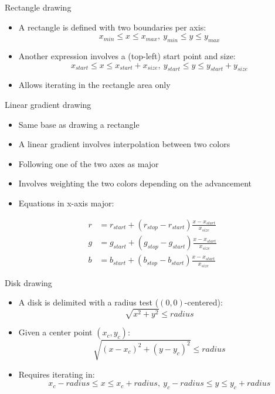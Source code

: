 \begin{frame}{Rectangle drawing}
  \begin{itemize}
  \item A rectangle is defined with two boundaries per axis:
\[
x_{min} \leq x \leq x_{max},~ y_{min} \leq y \leq y_{max}
\]
  \item Another expression involves a (top-left) start point and size:
\[
x_{start} \leq x \leq x_{start} + x_{size},~ y_{start} \leq y \leq y_{start} + y_{size}
\]
  \item Allows iterating in the rectangle area only
  \end{itemize}
\end{frame}

\begin{frame}{Linear gradient drawing}
  \begin{itemize}
  \item Same base as drawing a rectangle
  \item A linear gradient involves interpolation between two colors
  \item Following one of the two axes as major
  \item Involves weighting the two colors depending on the advancement
  \item Equations in x-axis major:
  \end{itemize}
\begin{align*}
r &= r_{start} + (r_{stop} - r_{start}) \frac{x - x_{start}}{x_{size}}\\
g &= g_{start} + (g_{stop} - g_{start}) \frac{x - x_{start}}{x_{size}}\\
b &= b_{start} + (b_{stop} - b_{start}) \frac{x - x_{start}}{x_{size}}
\end{align*}
\end{frame}

\begin{frame}{Disk drawing}
  \begin{itemize}
  \item A disk is delimited with a radius test (\((0,0)\)-centered):
\[
\sqrt{x^2 + y^2} \leq radius
\]
  \item Given a center point \((x_c,y_c)\):
\[
\sqrt{(x - x_c)^2 + (y - y_c)^2} \leq radius
\]
  \item Requires iterating in:
\[
x_c - radius \leq x \leq x_c + radius,~ y_c - radius \leq y \leq y_c + radius
\]
  \end{itemize}
\end{frame}

